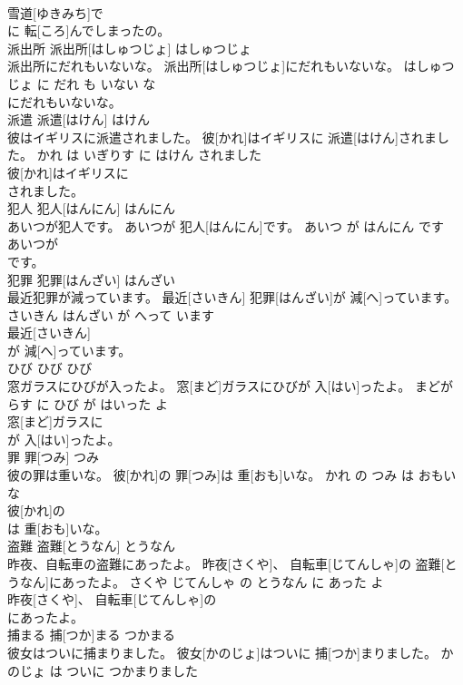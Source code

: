\documentclass[8pt]{extreport}
\begin{document}
\begin{CJK}{UTF8}{min}
\\	雪道[ゆきみち]で
\\	に 転[ころ]んでしまったの。			
\\	派出所	派出所[はしゅつじょ]	はしゅつじょ	
\\	派出所にだれもいないな。	派出所[はしゅつじょ]にだれもいないな。	はしゅつじょ に だれ も いない な	
\\	にだれもいないな。			
\\	派遣	派遣[はけん]	はけん	
\\	彼はイギリスに派遣されました。	彼[かれ]はイギリスに 派遣[はけん]されました。	かれ は いぎりす に はけん されました	
\\	彼[かれ]はイギリスに
\\	されました。			
\\	犯人	犯人[はんにん]	はんにん	
\\	あいつが犯人です。	あいつが 犯人[はんにん]です。	あいつ が はんにん です	
\\	あいつが
\\	です。			
\\	犯罪	犯罪[はんざい]	はんざい	
\\	最近犯罪が減っています。	最近[さいきん] 犯罪[はんざい]が 減[へ]っています。	さいきん はんざい が へって います	
\\	最近[さいきん]
\\	が 減[へ]っています。			
\\	ひび	ひび	ひび	
\\	窓ガラスにひびが入ったよ。	窓[まど]ガラスにひびが 入[はい]ったよ。	まどがらす に ひび が はいった よ	
\\	窓[まど]ガラスに
\\	が 入[はい]ったよ。			
\\	罪	罪[つみ]	つみ	
\\	彼の罪は重いな。	彼[かれ]の 罪[つみ]は 重[おも]いな。	かれ の つみ は おもい な	
\\	彼[かれ]の
\\	は 重[おも]いな。			
\\	盗難	盗難[とうなん]	とうなん	
\\	昨夜、自転車の盗難にあったよ。	昨夜[さくや]、 自転車[じてんしゃ]の 盗難[とうなん]にあったよ。	さくや じてんしゃ の とうなん に あった よ	
\\	昨夜[さくや]、 自転車[じてんしゃ]の
\\	にあったよ。			
\\	捕まる	捕[つか]まる	つかまる	
\\	彼女はついに捕まりました。	彼女[かのじょ]はついに 捕[つか]まりました。	かのじょ は ついに つかまりました	

\end{CJK}
\end{document}
